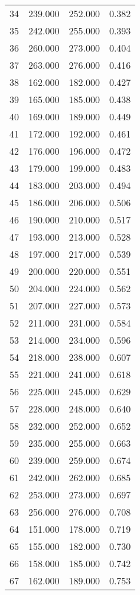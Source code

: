 \begin{tabular}{cccc}
  34 & 239.000 & 252.000 & 0.382 \\ 
  35 & 242.000 & 255.000 & 0.393 \\ 
  36 & 260.000 & 273.000 & 0.404 \\ 
  37 & 263.000 & 276.000 & 0.416 \\ 
  38 & 162.000 & 182.000 & 0.427 \\ 
  39 & 165.000 & 185.000 & 0.438 \\ 
  40 & 169.000 & 189.000 & 0.449 \\ 
  41 & 172.000 & 192.000 & 0.461 \\ 
  42 & 176.000 & 196.000 & 0.472 \\ 
  43 & 179.000 & 199.000 & 0.483 \\ 
  44 & 183.000 & 203.000 & 0.494 \\ 
  45 & 186.000 & 206.000 & 0.506 \\ 
  46 & 190.000 & 210.000 & 0.517 \\ 
  47 & 193.000 & 213.000 & 0.528 \\ 
  48 & 197.000 & 217.000 & 0.539 \\ 
  49 & 200.000 & 220.000 & 0.551 \\ 
  50 & 204.000 & 224.000 & 0.562 \\ 
  51 & 207.000 & 227.000 & 0.573 \\ 
  52 & 211.000 & 231.000 & 0.584 \\ 
  53 & 214.000 & 234.000 & 0.596 \\ 
  54 & 218.000 & 238.000 & 0.607 \\ 
  55 & 221.000 & 241.000 & 0.618 \\ 
  56 & 225.000 & 245.000 & 0.629 \\ 
  57 & 228.000 & 248.000 & 0.640 \\ 
  58 & 232.000 & 252.000 & 0.652 \\ 
  59 & 235.000 & 255.000 & 0.663 \\ 
  60 & 239.000 & 259.000 & 0.674 \\ 
  61 & 242.000 & 262.000 & 0.685 \\ 
  62 & 253.000 & 273.000 & 0.697 \\ 
  63 & 256.000 & 276.000 & 0.708 \\ 
  64 & 151.000 & 178.000 & 0.719 \\ 
  65 & 155.000 & 182.000 & 0.730 \\ 
  66 & 158.000 & 185.000 & 0.742 \\ 
  67 & 162.000 & 189.000 & 0.753 \\ 

\end{tabular}
